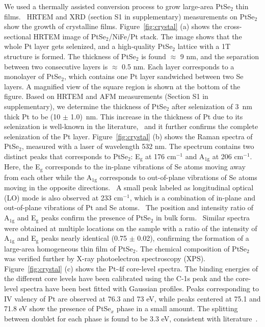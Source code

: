 \documentclass[journal=jacsat,manuscript=article]{achemso}
\begin{document}
 We used a thermally assisted conversion process to grow large-area PtSe$_{2}$ thin films.~\cite{jakhar2020optically}  
 HRTEM and XRD (section S1 in supplementary) measurements on PtSe$_2$ show the growth of crystalline films.   Figure~\ref{fig:crystal} (a) shows the cross-sectional HRTEM image of PtSe$_2$/NiFe/Pt stack. 
 The image shows that the whole Pt layer gets selenized, and a high-quality PtSe$_2$ lattice with a 1T structure is formed. The thickness of PtSe$_2$ is found $\approx$ 9 nm, and the separation between two consecutive layers is $\approx$ 0.5 nm. Each layer corresponds to a monolayer of PtSe$_2$, which contains one Pt layer sandwiched between two Se layers. A magnified view of the square region is shown at the bottom of the figure.  %
 Based on HRTEM and AFM measurements (Section S1 in supplementary), we determine the thickness of PtSe$_{2}$ after selenization of 3~nm thick Pt to be (10 $\pm$ 1.0)~nm. This increase in the thickness of Pt due to its selenization is well-known in the literature,~\cite{yim2018electrical} and it further confirms the complete selenization of the Pt layer.
 Figure~\ref{fig:crystal} (b) shows the Raman spectra of PtSe$_2$, measured with a laser of wavelength 532 nm. The spectrum contains two distinct peaks that corresponds to PtSe$_2$: E$_\mathrm{g}$ at 176 cm$^{-1}$ and A$_\mathrm{1g}$ at 206 cm$^{-1}$. Here, the E$_\mathrm{g}$ corresponds to the in-plane vibrations of Se atoms moving away from each other while the A$_\mathrm{1g}$ corresponds to out-of-plane vibrations of Se atoms moving in the opposite directions.~\cite{yan2017high} A small peak labeled as longitudinal optical (LO) mode is also observed at 233 cm$^{-1}$, which is a combination of in-plane and out-of-plane vibrations of Pt and Se atoms.~\cite{yan2017high, gulo2020temperature} The position and intensity ratio of A$_\mathrm{1g}$ and E$_\mathrm{g}$ peaks confirm the presence of PtSe$_2$ in bulk form.~\cite{yan2017high}
Similar spectra were obtained at multiple locations on the sample with a ratio of the intensity of A$_\mathrm{1g}$ and E$_\mathrm{g}$ peaks nearly identical (0.75 $\pm$ 0.02), confirming the formation of a large-area homogeneous thin film of PtSe$_{2}$. The chemical composition of PtSe$_2$ was verified further by X-ray photoelectron spectroscopy (XPS). Figure~\ref{fig:crystal} (c) shows the Pt-4f core-level spectra. The binding energies of the different core levels have been calibrated using the C-1s peak and the core-level
spectra have been best fitted with Gaussian profiles. Peaks corresponding to IV valency of Pt are observed at 76.3 and 73 eV, while peaks centered at 75.1 and 71.8 eV show the presence of PtSe$_x$ phase in a small amount. The splitting between doublet for each phase is found to be 3.3 eV, consistent with literature~\cite{su2018phase}. 
\end{document}
